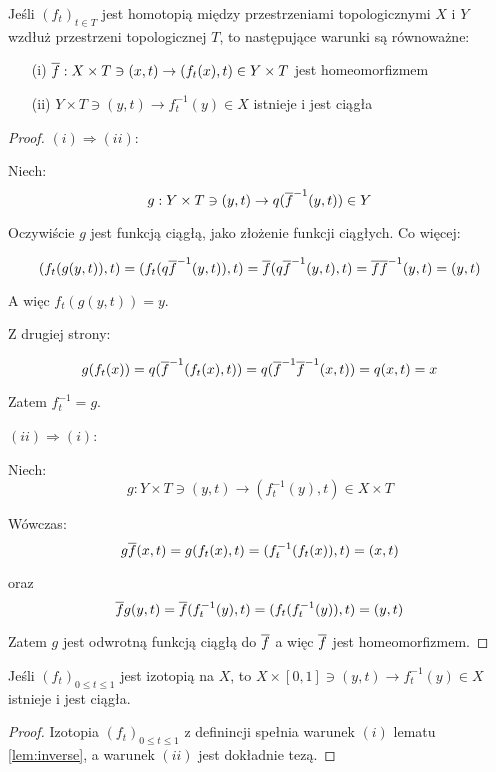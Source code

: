 \begin{lem} \label{lem:inverse}
  Jeśli $(f_t)_{t \in T}$ jest homotopią między przestrzeniami topologicznymi $X$ i $Y$ wzdłuż przestrzeni topologicznej $T$, to następujące warunki są równoważne:
  \begin{enumerate}
   \item[(i)] $\overline{f}: X \times T \ni (x, t) \rightarrow (f_t(x), t) \in Y \times T$ jest homeomorfizmem
   \item[(ii)] $Y \times T \ni (y, t) \rightarrow f_t^{-1}(y) \in X$ istnieje i jest ciągła
  \end{enumerate}
  
  \begin{proof}
    $(i) \Rightarrow (ii)$:
    
    Niech:
    \[g: Y \times T \ni (y, t) \rightarrow q(\overline{f}^{-1}(y, t)) \in Y\]
    
    Oczywiście $g$ jest funkcją ciągłą, jako złożenie funkcji ciągłych. Co więcej:
    
    \[(f_t(g(y,t)), t) = (f_t(q \overline{f}^{-1}(y,t)), t) = \overline{f}(q \overline{f}^{-1}(y,t), t) = \overline{f} \overline{f}^{-1}(y,t) = (y,t)\]
    
    A więc $f_t(g(y,t)) = y$.
    
    Z drugiej strony:
    
    \[g(f_t(x)) = q(\overline{f}^{-1}(f_t(x),t)) = q(\overline{f}^{-1} \overline{f}^{-1}(x,t)) = q(x,t) = x\]
    
    Zatem $f_t^{-1} = g$.
    
    $(ii) \Rightarrow (i)$:
    
    Niech:
    \[g: Y \times T \ni (y, t) \rightarrow (f_t^{-1}(y), t) \in X \times T\]
    
    Wówczas:
    \[g\overline{f}(x,t) = g(f_t(x), t) = (f_t^{-1}(f_t(x)), t) = (x,t)\]
    
    oraz
    \[\overline{f}g(y,t) = \overline{f}(f_t^{-1}(y), t) = (f_t(f_t^{-1}(y)), t) = (y,t)\]
    
    Zatem $g$ jest odwrotną funkcją ciągłą do $\overline{f}$ a więc $\overline{f}$ jest homeomorfizmem.
  \end{proof}
\end{lem}


\begin{cor} \label{cor:isotopy-inverse}
  Jeśli $(f_t)_{0 \leq t \leq 1}$ jest izotopią na $X$, to $X \times [0,1] \ni (y, t) \rightarrow f_t^{-1}(y) \in X$ istnieje i jest ciągła.
  \begin{proof}
    Izotopia $(f_t)_{0 \leq t \leq 1}$ z definincji spełnia warunek $(i)$ lematu \ref{lem:inverse}, a warunek $(ii)$ jest dokładnie tezą.
  \end{proof}
\end{cor}

